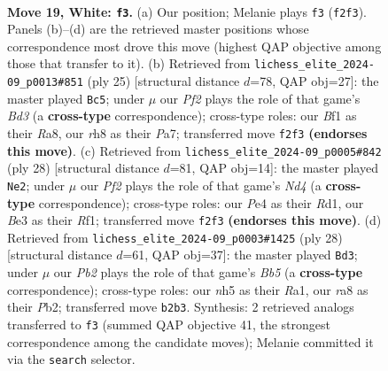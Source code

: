 \documentclass[11pt]{article}
\begin{document}
\clearpage

\begin{figure}[p]\centering
\begin{subfigure}{0.46\textwidth}\centering
\resizebox{\linewidth}{!}{%
\newchessgame
\chessboard[
  setfen={rn2b2r/ppq2kbp/3pp1p1/4p1Pn/4P3/2N1B3/PPPK1PQP/3RRB2 w - - 6 19},
  showmover=false,
  pgfstyle=straightmove, color=movearrow, markmove={f2-f3}
]}
\caption{}
\end{subfigure}\hfill
\begin{subfigure}{0.46\textwidth}\centering
\resizebox{\linewidth}{!}{%
\newchessgame
\chessboard[
  setfen={r4rk1/pp1nqpp1/2pbb2p/4p3/4P2N/1P4P1/P1P1QPBP/R1BR2K1 b - - 0 13},
  showmover=false,
  pgfstyle=straightmove, color=movearrow, markmove={d6-c5}
]}
\caption{}
\end{subfigure}
\\[4pt]
\begin{subfigure}{0.46\textwidth}\centering
\resizebox{\linewidth}{!}{%
\newchessgame
\chessboard[
  setfen={r1bq1rk1/4bppp/p7/npppP3/3N4/1BP1B3/PP1Q1PPP/3R1RK1 w - - 0 15},
  showmover=false,
  pgfstyle=straightmove, color=movearrow, markmove={d4-e2}
]}
\caption{}
\end{subfigure}\hfill
\begin{subfigure}{0.46\textwidth}\centering
\resizebox{\linewidth}{!}{%
\newchessgame
\chessboard[
  setfen={r1b2rk1/ppq1bpp1/4pn1p/1B2p3/P3P3/2N5/1PPBQPPP/R2R2K1 w - - 2 15},
  showmover=false,
  pgfstyle=straightmove, color=movearrow, markmove={b5-d3}
]}
\caption{}
\end{subfigure}
\caption{\textbf{Move 19, White: \texttt{f3}.} (a) Our position; Melanie plays \texttt{f3} (\texttt{f2f3}). Panels (b)--(d) are the retrieved master positions whose correspondence most drove this move (highest QAP objective among those that transfer to it). (b) Retrieved from \texttt{lichess\_elite\_2024-09\_p0013\#851} (ply 25) [structural distance $d$=78, QAP obj=27]: the master played \texttt{Bc5}; under $\mu$ our \emph{Pf2} plays the role of that game's \emph{Bd3} (a \textbf{cross-type} correspondence); cross-type roles: our \emph{B}f1 as their \emph{R}a8, our \emph{r}h8 as their \emph{P}a7; transferred move \texttt{f2f3} \textbf{(endorses this move)}. (c) Retrieved from \texttt{lichess\_elite\_2024-09\_p0005\#842} (ply 28) [structural distance $d$=81, QAP obj=14]: the master played \texttt{Ne2}; under $\mu$ our \emph{Pf2} plays the role of that game's \emph{Nd4} (a \textbf{cross-type} correspondence); cross-type roles: our \emph{P}e4 as their \emph{R}d1, our \emph{B}e3 as their \emph{R}f1; transferred move \texttt{f2f3} \textbf{(endorses this move)}. (d) Retrieved from \texttt{lichess\_elite\_2024-09\_p0003\#1425} (ply 28) [structural distance $d$=61, QAP obj=37]: the master played \texttt{Bd3}; under $\mu$ our \emph{Pb2} plays the role of that game's \emph{Bb5} (a \textbf{cross-type} correspondence); cross-type roles: our \emph{n}h5 as their \emph{R}a1, our \emph{r}a8 as their \emph{P}b2; transferred move \texttt{b2b3}. Synthesis: 2 retrieved analogs transferred to \texttt{f3} (summed QAP objective 41, the strongest correspondence among the candidate moves); Melanie committed it via the \texttt{search} selector.}
\label{fig:thought-m36}
\end{figure}
\end{document}
